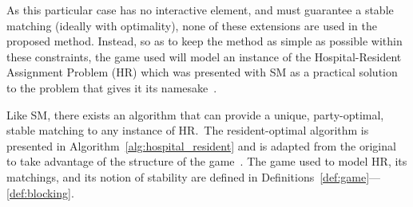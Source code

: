 As this particular case has no interactive element, and must guarantee a stable
matching (ideally with optimality), none of these extensions are used in the
proposed method. Instead, so as to keep the method as simple as possible within
these constraints, the game used will model an instance of the Hospital-Resident
Assignment Problem (HR) which was presented with SM as a practical solution to
the problem that gives it its namesake~\cite{Gale1962}.

Like SM, there exists an algorithm that can provide a unique, party-optimal,
stable matching to any instance of HR.\ The resident-optimal algorithm is
presented in Algorithm~\ref{alg:hospital_resident} and is adapted from the
original to take advantage of the structure of the game~\cite{Roth1984}. The
game used to model HR, its matchings, and its notion of stability are defined in
Definitions~\ref{def:game}---\ref{def:blocking}.

